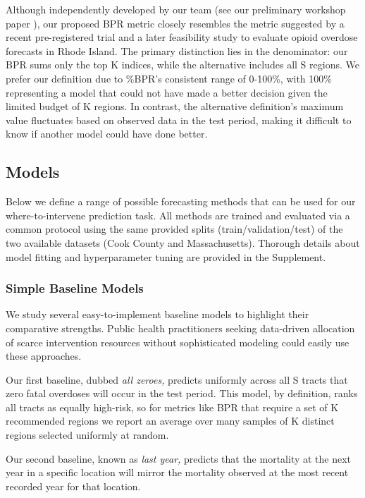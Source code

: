 Although independently developed by our team (see our preliminary workshop paper \citet{heutonZIGP2022}
), our proposed BPR metric closely resembles the metric suggested by a recent pre-registered trial \citep{marshallPreventingOverdoseUsing2022} and a later feasibility study \citep{allenTranslatingPredictiveAnalytics2023} to evaluate opioid overdose forecasts in Rhode Island. The primary distinction lies in the denominator: our BPR sums only the top K indices, while the alternative includes all S regions. We prefer our definition due to \%BPR's consistent range of 0-100\%, with 100\% representing a model that could not have made a better decision given the limited budget of K regions. In contrast, the alternative definition's maximum value fluctuates based on observed data in the test period, making it difficult to know if another model could have done better.

\subsection{Models}\label{models}

Below we define a range of possible forecasting methods that can be used for our where-to-intervene prediction task. All methods are trained and evaluated via a common protocol using the same provided splits (train/validation/test) of the two available datasets (Cook County and Massachusetts). Thorough details about model fitting and hyperparameter tuning are provided in the Supplement. 

\subsubsection{Simple Baseline Models}\label{simple-baseline-models}

We study several easy-to-implement baseline models to highlight their comparative strengths. Public health practitioners seeking data-driven allocation of scarce intervention resources without sophisticated modeling could easily use these approaches.

Our first baseline, dubbed \emph{all zeroes,} predicts uniformly across all S tracts that zero fatal overdoses will occur in the test period. This model, by definition, ranks all tracts as equally high-risk, so for metrics like BPR that require a set of K recommended regions we report an average over many samples of K distinct regions selected uniformly at random.

Our second baseline, known as \emph{last year,} predicts that the mortality at the next year in a specific location will mirror the mortality observed at the most recent recorded year for that location.


